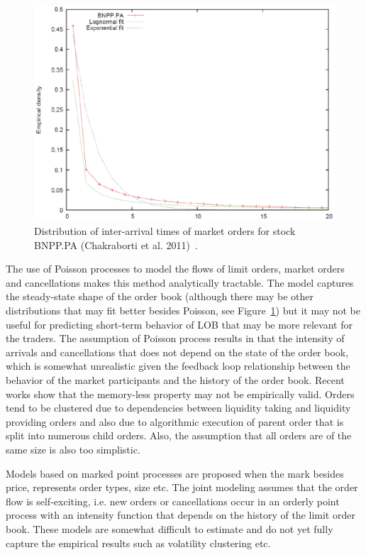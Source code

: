 	\begin{figure}[!ht]
   	\centering
   	\includegraphics[width=\textwidth]{chapters/chapter_trade_data_models/figures/intertime.png} 
   	\caption{Distribution of inter-arrival times of market orders for stock BNPP.PA (Chakraborti et al. 2011)~\cite{chaktokpat}.\label{fig:intertimefig}}
	\end{figure}


The use of Poisson processes to model the flows of limit orders, market orders and cancellations makes this method analytically tractable. The model captures the steady-state shape of the order book (although there may be other distributions that may fit better besides Poisson, see Figure~\ref{fig:intertimefig}) but it may not be useful for predicting short-term behavior of LOB that may be more relevant for the traders. The assumption of Poisson process results in that the intensity of arrivals and cancellations that does not depend on the state of the order book, which is somewhat unrealistic given the feedback loop relationship between the behavior of the market participants and the history of the order book. Recent works show that the memory-less property may not be empirically valid. Orders tend to be clustered due to dependencies between liquidity taking and liquidity providing orders and also due to algorithmic execution of parent order that is split into numerous child orders. Also, the assumption that all orders are of the same size is also too simplistic. 


Models based on marked point processes are proposed when the mark besides price, represents order types, size etc. The joint modeling assumes that the order flow is self-exciting, i.e. new orders or cancellations occur in an orderly point process with an intensity function that depends on the history of the limit order book. These models are somewhat difficult to estimate and do not yet fully capture the empirical results such as volatility clustering etc. \twomedskip


